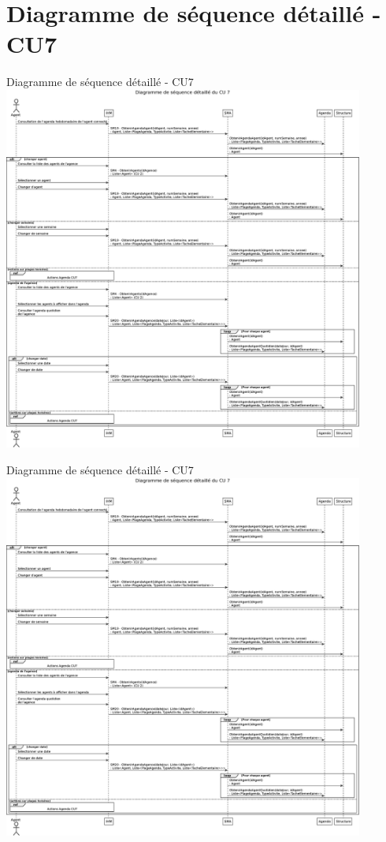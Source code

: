 \documentclass[xetex]{beamer}
\begin{document}
    \section{Diagramme de séquence détaillé - CU7} %
    \begin{frame}{Diagramme de séquence détaillé - CU7}
  {\includegraphics[height=12cm]{../report/figures/eps/DSD_CU7}}
    \end{frame}
    
    
        \begin{frame}{Diagramme de séquence détaillé - CU7}
  {\includegraphics[height=12cm]{../report/figures/eps/DSD_CU7}}
    \end{frame}
    
\end{document}
